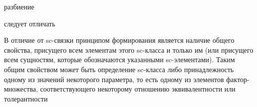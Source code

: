 \begin{SCn}

\begin{scnindent}

\begin{scnindent}
\begin{scnrelfromset}{разбиение}
\begin{scnindent}
\end{scnindent}		
\end{scnrelfromset}	
\end{scnindent}
\end{scnindent}






\begin{scnindent}
\end{scnindent}




\begin{scnrelfromset}{следует отличать}
\end{scnrelfromset}	


{В отличие от sc-связки принципом формирования
является наличие общего свойства, присущего
всем элементам этого sc-класса и только им (или
присущего всем сущностям, которые
обозначаются указанными sc-элементами). Таким
общим свойством может быть определение
sc-класса либо принадлежность одному из
значений некоторого параметра, то есть одному
из элементов фактор-множества,
соответствующего некоторому отношению
эквивалентности или толерантности}


\end{SCn}
